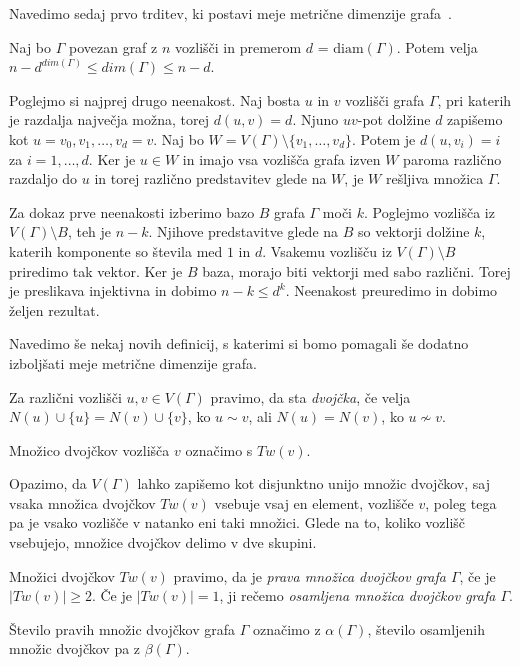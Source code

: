 \documentclass[mat1, tisk]{fmfdelo}
\begin{document}
Navedimo sedaj prvo trditev, ki postavi meje metrične dimenzije grafa~\cite{10chartrand}.
%
\begin{trditev}\label{trditev2.10}
  Naj bo $\Gamma$ povezan graf z $n$ vozlišči in premerom $d$ = $\text{diam}(\Gamma)$. Potem velja
  $n - d^{dim(\Gamma)} \leq dim(\Gamma) \leq n - d$.
\end{trditev}
\begin{dokaz}
  Poglejmo si najprej drugo neenakost. Naj bosta $u$ in $v$ vozlišči grafa 
  $\Gamma$, pri katerih je razdalja največja možna, torej $d(u,v) = d$. 
  Njuno $uv$-pot dolžine $d$ zapišemo kot $u=v_0, v_1, \ldots, v_d=v$. 
  Naj bo $W = V(\Gamma) \setminus \{v_1, \ldots, v_d \}$. Potem je 
  $d(u,v_i) = i$ za $i = 1, \ldots, d$. Ker je $u \in W$ in imajo 
  vsa vozlišča grafa izven $W$ paroma različno razdaljo do $u$ in 
  torej različno predstavitev glede na $W$, je $W$ 
  rešljiva množica $\Gamma$.

  Za dokaz prve neenakosti izberimo bazo $B$ grafa $\Gamma$ moči $k$. 
  Poglejmo vozlišča iz $V(\Gamma) \setminus B$, teh je $n-k$. 
  Njihove predstavitve 
  glede na $B$ so vektorji dolžine $k$, katerih komponente so števila med 
  $1$ in $d$. Vsakemu vozlišču iz $V(\Gamma) \setminus B$ priredimo 
  tak vektor. Ker je $B$ baza, morajo biti vektorji med sabo različni. 
  Torej je preslikava injektivna in dobimo $n - k \leq d^k$. 
  Neenakost preuredimo in dobimo željen rezultat.
\end{dokaz}
%
Navedimo še nekaj novih definicij, s katerimi si bomo pomagali še dodatno 
izboljšati meje metrične dimenzije grafa.
%
\begin{definicija}
  Za različni vozlišči $u, v\in V(\Gamma)$ pravimo, da sta \emph{dvojčka}, če velja 
  $N(u) \cup \{u\} = N(v) \cup \{v\} $, ko $u \sim v$, ali 
  $N(u) = N(v) $, ko $u \nsim v$.

  Množico dvojčkov vozlišča $v$ označimo s $Tw(v)$.
\end{definicija}
%
Opazimo, da $V(\Gamma)$ lahko zapišemo kot disjunktno unijo množic 
dvojčkov, saj vsaka množica dvojčkov $Tw(v)$ vsebuje vsaj en element, vozlišče $v$, 
poleg tega pa je vsako vozlišče v natanko eni taki množici.
Glede na to, koliko vozlišč vsebujejo, množice dvojčkov delimo v dve skupini.
%
\begin{definicija}
  Množici dvojčkov $Tw(v)$ pravimo, da je \emph{prava množica dvojčkov grafa $\Gamma$}, 
  če je $|Tw(v)| \geq 2$. Če je $|Tw(v)| = 1$, ji rečemo 
  \emph{osamljena množica dvojčkov grafa $\Gamma$}. 

  Število pravih množic dvojčkov grafa $\Gamma$ označimo z \emph{$\alpha(\Gamma)$}, število 
  osamljenih množic dvojčkov pa z \emph{$\beta(\Gamma)$}.
\end{definicija}
\end{document}
